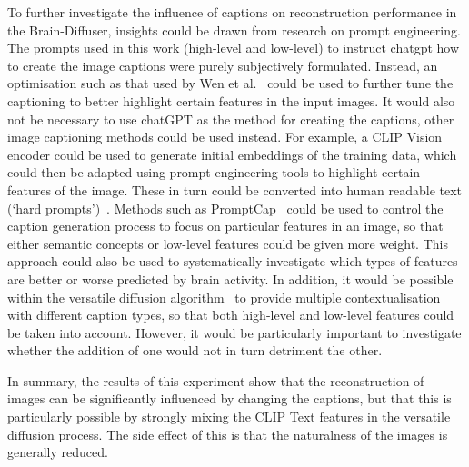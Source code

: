 To further investigate the influence of captions on reconstruction performance in the Brain-Diffuser, insights could be drawn from research on prompt engineering. The prompts used in this work (high-level and low-level) to instruct chatgpt how to create the image captions were purely subjectively formulated. Instead, an optimisation such as that used by Wen et al.~\cite{wenHardPromptsMade2023} could be used to further tune the captioning to better highlight certain features in the input images. It would also not be necessary to use chatGPT as the method for creating the captions, other image captioning methods could be used instead. For example, a CLIP Vision encoder could be used to generate initial embeddings of the training data, which could then be adapted using prompt engineering tools to highlight certain features of the image. These in turn could be converted into human readable text (`hard prompts')~\cite{wenHardPromptsMade2023}. Methods such as PromptCap~\cite{Hu_2023_ICCV} could be used to control the caption generation process to focus on particular features in an image, so that either semantic concepts or low-level features could be given more weight. This approach could also be used to systematically investigate which types of features are better or worse predicted by brain activity.  In addition, it would be possible within the versatile diffusion algorithm~\cite{xuVersatileDiffusionText2024} to provide multiple contextualisation with different caption types, so that both high-level and low-level features could be taken into account. However, it would be particularly important to investigate whether the addition of one would not in turn detriment the other. 

In summary, the results of this experiment show that the reconstruction of images can be significantly influenced by changing the captions, but that this is particularly possible by strongly mixing the CLIP Text features in the versatile diffusion process. The side effect of this is that the naturalness of the images is generally reduced. 


